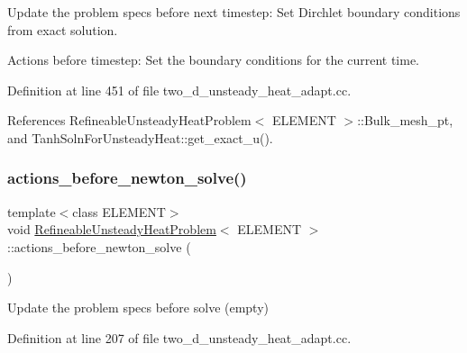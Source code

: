 Update the problem specs before next timestep\+: Set Dirchlet boundary conditions from exact solution. 

Actions before timestep\+: Set the boundary conditions for the current time. 

Definition at line 451 of file two\+\_\+d\+\_\+unsteady\+\_\+heat\+\_\+adapt.\+cc.



References Refineable\+Unsteady\+Heat\+Problem$<$ E\+L\+E\+M\+E\+N\+T $>$\+::\+Bulk\+\_\+mesh\+\_\+pt, and Tanh\+Soln\+For\+Unsteady\+Heat\+::get\+\_\+exact\+\_\+u().

\mbox{\label{classRefineableUnsteadyHeatProblem_aac1935e15c67b196e6db97dd058511b5}} 
\subsubsection{\texorpdfstring{actions\+\_\+before\+\_\+newton\+\_\+solve()}{actions\_before\_newton\_solve()}}
{\footnotesize\ttfamily template$<$class E\+L\+E\+M\+E\+NT$>$ \\
void \hyperlink{classRefineableUnsteadyHeatProblem}{Refineable\+Unsteady\+Heat\+Problem}$<$ E\+L\+E\+M\+E\+NT $>$\+::actions\+\_\+before\+\_\+newton\+\_\+solve (\begin{DoxyParamCaption}{ }\end{DoxyParamCaption})\hspace{0.3cm}{\ttfamily [inline]}}



Update the problem specs before solve (empty) 



Definition at line 207 of file two\+\_\+d\+\_\+unsteady\+\_\+heat\+\_\+adapt.\+cc.

\mbox{\label{classRefineableUnsteadyHeatProblem_a4d8eec1505a3c53960a3182ec462b4e7}} 

